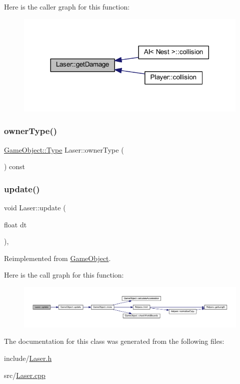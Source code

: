Here is the caller graph for this function\+:
\nopagebreak
\begin{figure}[H]
\begin{center}
\leavevmode
\includegraphics[width=317pt]{class_laser_a121266b7a10b80a71304e85421eebc3a_icgraph}
\end{center}
\end{figure}
\mbox{\label{class_laser_abbda8cd10b6ea38a1be7bd867a902dd9}} 
\subsubsection{\texorpdfstring{owner\+Type()}{ownerType()}}
{\footnotesize\ttfamily \hyperlink{class_game_object_a4bf9e8f660e6a49f1b802c2aa9dd95af}{Game\+Object\+::\+Type} Laser\+::owner\+Type (\begin{DoxyParamCaption}{ }\end{DoxyParamCaption}) const}

\mbox{\label{class_laser_af692c14903cce59991bdd9cc9f78aeb3}} 
\subsubsection{\texorpdfstring{update()}{update()}}
{\footnotesize\ttfamily void Laser\+::update (\begin{DoxyParamCaption}\item[{float}]{dt }\end{DoxyParamCaption})\hspace{0.3cm}{\ttfamily [override]}, {\ttfamily [virtual]}}



Reimplemented from \hyperlink{class_game_object_a2fece397b6343682d639f8943f124d0e}{Game\+Object}.

Here is the call graph for this function\+:
\nopagebreak
\begin{figure}[H]
\begin{center}
\leavevmode
\includegraphics[width=350pt]{class_laser_af692c14903cce59991bdd9cc9f78aeb3_cgraph}
\end{center}
\end{figure}


The documentation for this class was generated from the following files\+:\begin{DoxyCompactItemize}
\item 
include/\hyperlink{_laser_8h}{Laser.\+h}\item 
src/\hyperlink{_laser_8cpp}{Laser.\+cpp}\end{DoxyCompactItemize}
